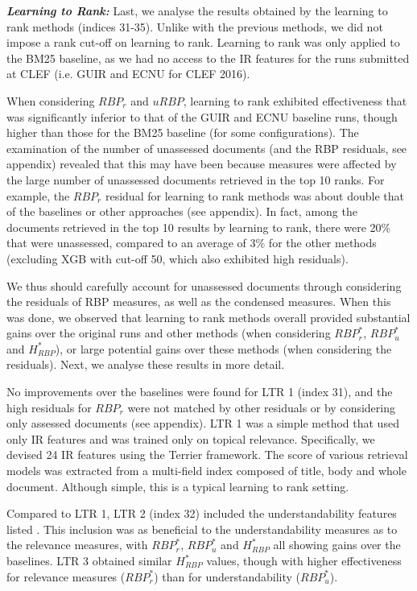 \documentclass[10pt,a4paper]{article}
\begin{document}
\textit{\textbf{Learning to Rank:}} Last, we analyse the results obtained by the learning to rank methods (indices 31-35). Unlike with the previous methods, we did not impose a rank cut-off on learning to rank. Learning to rank was only applied to the BM25 baseline, as we had no access to the IR features for the runs submitted at CLEF (i.e. GUIR and ECNU for CLEF 2016).

When considering $RBP_r$ and $uRBP$, learning to rank exhibited effectiveness that was significantly inferior to that of the GUIR and ECNU baseline runs, though higher than those for the BM25 baseline (for some configurations). The examination of the number of unassessed documents (and the RBP residuals, see appendix) revealed that this may have been because measures were affected by the large number of unassessed documents retrieved in the top 10 ranks. For example, the $RBP_r$ residual for learning to rank methods was about double that of the baselines or other approaches (see appendix). In fact, among the documents retrieved in the top 10 results by learning to rank, there were 20\% that were unassessed, compared to an average of 3\% for the other methods (excluding XGB with cut-off 50, which also exhibited high residuals). 

We thus should carefully account for unassessed documents through considering the residuals of RBP measures, as well as the condensed measures. When this was done, we observed that learning to rank methods overall provided substantial gains over the original runs and other methods (when considering $RBP^*_r$, $RBP^*_u$ and $H_{RBP}^*$), or large potential gains over these methods (when considering the residuals). Next, we analyse these results in more detail. 

No improvements over the baselines were found for LTR 1 (index 31), and the high residuals for $RBP_r$ were not matched by other residuals or by considering only assessed documents (see appendix). LTR 1 was a simple method that used only IR features and was trained only on topical relevance. Specifically, we devised 24 IR features using the Terrier framework. The score of various retrieval models was extracted from a multi-field index composed of title, body and whole document. Although simple, this is a typical learning to rank setting.

Compared to LTR 1, LTR 2 (index 32) included the understandability features listed . This inclusion was as beneficial to the understandability measures as to the relevance measures, with $RBP_r^*$, $RBP_u^*$ and $H_{RBP}^*$ all showing gains over the baselines. LTR 3 obtained similar $H_{RBP}^*$ values, though with higher effectiveness for relevance measures ($RBP_r^*$) than for understandability ($RBP_u^*$).
\end{document}
